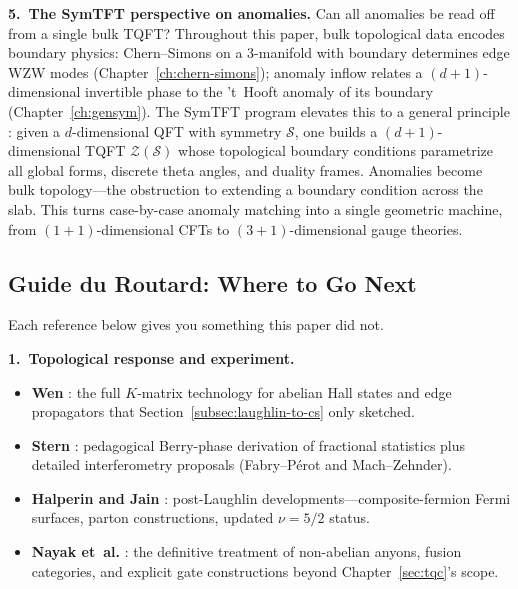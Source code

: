 \medskip
\noindent\textbf{5.\ The SymTFT perspective on anomalies.}
Can all anomalies be read off from a single bulk TQFT? Throughout this paper, bulk topological data encodes boundary physics: Chern--Simons on a 3-manifold with boundary determines edge WZW modes (Chapter~\ref{ch:chern-simons}); anomaly inflow relates a $(d{+}1)$-dimensional invertible phase to the 't~Hooft anomaly of its boundary (Chapter~\ref{ch:gensym}). The SymTFT program elevates this to a general principle \cite{Bhardwaj2023GeneralizedSymmetryLectures}: given a $d$-dimensional QFT with symmetry $\mathcal{S}$, one builds a $(d{+}1)$-dimensional TQFT $\mathcal{Z}(\mathcal{S})$ whose topological boundary conditions parametrize all global forms, discrete theta angles, and duality frames. Anomalies become bulk topology---the obstruction to extending a boundary condition across the slab. This turns case-by-case anomaly matching into a single geometric machine, from $(1{+}1)$-dimensional CFTs to $(3{+}1)$-dimensional gauge theories.

\subsection{Guide du Routard: Where to Go Next}
\label{subsec:guide-du-routard}

Each reference below gives you something this paper did not.

\medskip
\noindent\textbf{1.\ Topological response and experiment.}
\begin{itemize}
\item \textbf{Wen} \cite{Wen1995TopologicalOrdersEdgeExcitations}: the full $K$-matrix technology for abelian Hall states and edge propagators that Section~\ref{subsec:laughlin-to-cs} only sketched.
\item \textbf{Stern} \cite{Stern2008AnyonsQHEReview}: pedagogical Berry-phase derivation of fractional statistics plus detailed interferometry proposals (Fabry--P\'erot and Mach--Zehnder).
\item \textbf{Halperin and Jain} \cite{HalperinJain2020FQHENewDevelopments}: post-Laughlin developments---composite-fermion Fermi surfaces, parton constructions, updated $\nu=5/2$ status.
\item \textbf{Nayak et~al.} \cite{NayakSimonSternFreedmanDasSarma2008NonabelianAnyons}: the definitive treatment of non-abelian anyons, fusion categories, and explicit gate constructions beyond Chapter~\ref{sec:tqc}'s scope.
\end{itemize}

